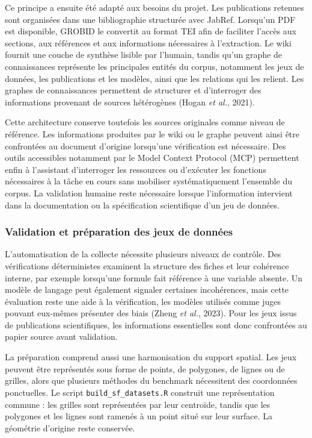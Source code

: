 \documentclass[11pt,a4paper]{article}
\begin{document}
Ce principe a ensuite été adapté aux besoins du projet. Les publications retenues sont organisées dans une bibliographie structurée avec JabRef. Lorsqu'un PDF est disponible, GROBID le convertit au format TEI afin de faciliter l'accès aux sections, aux références et aux informations nécessaires à l'extraction. Le wiki fournit une couche de synthèse lisible par l'humain, tandis qu'un graphe de connaissances représente les principales entités du corpus, notamment les jeux de données, les publications et les modèles, ainsi que les relations qui les relient. Les graphes de connaissances permettent de structurer et d'interroger des informations provenant de sources hétérogènes (Hogan \textit{et al.}, 2021).

Cette architecture conserve toutefois les sources originales comme niveau de référence. Les informations produites par le wiki ou le graphe peuvent ainsi être confrontées au document d'origine lorsqu'une vérification est nécessaire. Des outils accessibles notamment par le Model Context Protocol (MCP) permettent enfin à l'assistant d'interroger les ressources ou d'exécuter les fonctions nécessaires à la tâche en cours sans mobiliser systématiquement l'ensemble du corpus. La validation humaine reste nécessaire lorsque l'information intervient dans la documentation ou la spécification scientifique d'un jeu de données.


\subsubsection{Validation et préparation des jeux de données}


L'automatisation de la collecte nécessite plusieurs niveaux de contrôle. Des vérifications déterministes examinent la structure des fiches et leur cohérence interne, par exemple lorsqu'une formule fait référence à une variable absente. Un modèle de langage peut également signaler certaines incohérences, mais cette évaluation reste une aide à la vérification, les modèles utilisés comme juges pouvant eux-mêmes présenter des biais (Zheng \textit{et al.}, 2023). Pour les jeux issus de publications scientifiques, les informations essentielles sont donc confrontées au papier source avant validation.

La préparation comprend aussi une harmonisation du support spatial. Les jeux peuvent être représentés sous forme de points, de polygones, de lignes ou de grilles, alors que plusieurs méthodes du benchmark nécessitent des coordonnées ponctuelles. Le script \texttt{build\_sf\_datasets.R} construit une représentation commune : les grilles sont représentées par leur centroïde, tandis que les polygones et les lignes sont ramenés à un point situé sur leur surface. La géométrie d'origine reste conservée.
\end{document}
